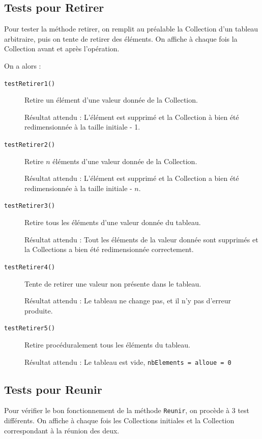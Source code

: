 \documentclass[11pt]{article}
\begin{document}
\subsection{Tests pour Retirer}	
Pour tester la méthode retirer, on remplit au préalable la Collection d'un tableau arbitraire, puis on tente de retirer des éléments. On affiche à chaque fois la Collection avant et après l'opération.

On a alors :
\begin{description}
	\item[\texttt{testRetirer1()}] Retire un élément d'une valeur donnée de la Collection.
	
	Résultat attendu : L'élément est supprimé et la Collection à bien été redimensionnée à la taille initiale - 1.
	
	\item[\texttt{testRetirer2()}] Retire $n$ éléments d'une valeur donnée de la Collection.
	
	Résultat attendu : L'élément est supprimé et la Collection a bien été redimensionnée à la taille initiale - $n$.
	
	\item[\texttt{testRetirer3()}] Retire tous les éléments d'une valeur donnée du tableau.
	
	Résultat attendu : Tout les éléments de la valeur donnée sont supprimés et la Collections a bien été redimensionnée correctement.
	
	\item[\texttt{testRetirer4()}] Tente de retirer une valeur non présente dans le tableau.
	
	Résultat attendu : Le tableau ne change pas, et il n'y pas d'erreur produite.
	
	\item[\texttt{testRetirer5()}] Retire procéduralement tous les éléments du tableau.
	
	Résultat attendu : Le tableau est vide, \texttt{nbElements = alloue = 0}
\end{description}

\subsection{Tests pour Reunir}
Pour vérifier le bon fonctionnement de la méthode \texttt{Reunir}, on procède à 3 test différents. On affiche à chaque fois les Collections initiales et la Collection correspondant à la réunion des deux.
\end{document}
